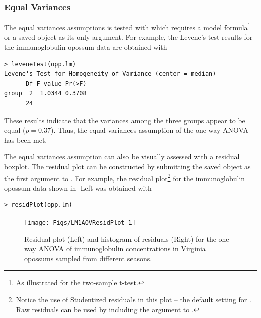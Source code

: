 \documentclass[10pt,openany]{book}\usepackage[]{graphicx}\usepackage[]{color}
\makeatletter
\newenvironment{kframe}{%
 \def\at@end@of@kframe{}%
 \ifinner\ifhmode%
  \def\at@end@of@kframe{\end{minipage}}%
  \begin{minipage}{\columnwidth}%
 \fi\fi%
 \def\FrameCommand##1{\hskip\@totalleftmargin \hskip-\fboxsep
 \colorbox{shadecolor}{##1}\hskip-\fboxsep
     \hskip-\linewidth \hskip-\@totalleftmargin \hskip\columnwidth}%
 \MakeFramed {\advance\hsize-\width
   \@totalleftmargin\z@ \linewidth\hsize
   \@setminipage}}%
 {\par\unskip\endMakeFramed%
 \at@end@of@kframe}
\newenvironment{knitrout}{}{} %
\makeatother
\begin{document}
\subsubsection*{Equal Variances}
The equal variances assumptions is tested with  which requires a model formula\footnote{As illustrated for the two-sample t-test.} or a saved  object as its only argument.  For example, the Levene's test results for the immunoglobulin opossum data are obtained with

\begin{knitrout}
\color{fgcolor}\begin{kframe}
\begin{verbatim}
> leveneTest(opp.lm)
Levene's Test for Homogeneity of Variance (center = median)
      Df F value Pr(>F)
group  2  1.0344 0.3708
      24               
\end{verbatim}
\end{kframe}
\end{knitrout}

These results indicate that the variances among the three groups appear to be equal ($p=0.37$).  Thus, the equal variances assumption of the one-way ANOVA has been met.

The equal variances assumption can also be visually assessed with a residual boxplot.  The residual plot can be constructed by submitting the saved  object as the first argument to .  For example, the residual plot\footnote{Notice the use of Studentized residuals in this plot -- the default setting for .  Raw residuals can be used by including the  argument to .} for the immunoglobulin opossum data shown in -Left was obtained with

\begin{knitrout}
\color{fgcolor}\begin{kframe}
\begin{verbatim}
> residPlot(opp.lm)
\end{verbatim}
\end{kframe}\begin{figure}[!h]

{\centering \texttt{[image: Figs/LM1AOVResidPlot-1]} 

}

\caption[Residual plot (Left) and histogram of residuals (Right) for the one-way ANOVA of immunoglobulin concentrations in Virginia opossums sampled from different seasons]{Residual plot (Left) and histogram of residuals (Right) for the one-way ANOVA of immunoglobulin concentrations in Virginia opossums sampled from different seasons.}\label{fig:LM1AOVResidPlot}
\end{figure}


\end{knitrout}
\end{document}

